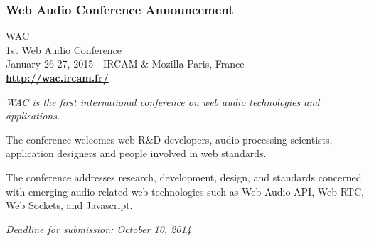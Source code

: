 \documentclass[10pt, final, hyperref, table]{beamer}
\begin{document}
\begin{frame}
  \frametitle{Web Audio Conference Announcement}

  \begin{center}
    WAC\\
 1st Web Audio Conference\\

    January 26-27, 2015 - IRCAM \& Mozilla Paris, France\\
    \textbf{\url{http://wac.ircam.fr/}}
  \end{center}

\emph{WAC is the first international conference on web audio technologies and applications.}

The conference welcomes web R\&D developers, audio processing scientists, application designers and people involved in web standards.

The conference addresses research, development, design, and standards concerned with emerging audio-related web technologies such as Web Audio API, Web RTC, Web Sockets, and Javascript. 

\begin{center}
  \emph{Deadline for submission: October 10, 2014}
\end{center}

\end{frame}
\end{document}
